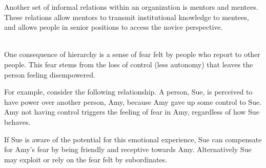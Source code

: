 Another set of informal relations within an organization is mentors and mentees. These relations allow mentors to transmit institutional knowledge to mentees, and allows people in senior positions to access the novice perspective. 


\ \\

One consequence of hierarchy is a sense of fear felt by people who report to other people. This fear stems from the loss of control (less autonomy) that leaves the person feeling disempowered. 

For example, consider the following relationship. A person, Sue, is perceived to have power over another person, Amy, because Amy gave up some control to Sue. Amy not having control triggers the feeling of fear in Amy, regardless of how Sue behaves. 

If Sue is aware of the potential for this emotional experience, Sue can compensate for Amy's fear by being friendly and receptive towards Amy. Alternatively Sue may exploit or rely on the fear felt by subordinates. 




